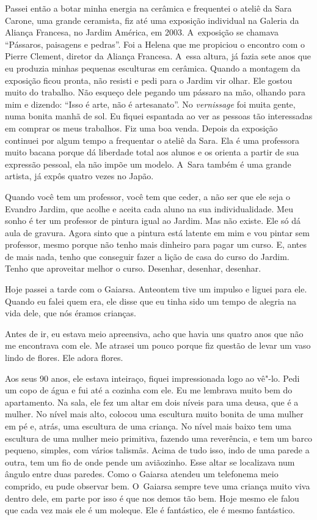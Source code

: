 Passei então a botar minha energia na cerâmica e frequentei o ateliê da
Sara Carone, uma grande ceramista, fiz até uma exposição individual na
Galeria da Aliança Francesa, no Jardim América, em 2003. A~exposição se
chamava ``Pássaros, paisagens e pedras''. Foi a Helena que me propiciou
o encontro com o Pierre Clement, diretor da Aliança Francesa. A~essa
altura, já fazia sete anos que eu produzia minhas pequenas esculturas em
cerâmica. Quando a montagem da exposição ficou pronta, não resisti e
pedi para o Jardim vir olhar. Ele gostou muito do trabalho. Não esqueço
dele pegando um pássaro na mão, olhando para mim e dizendo: ``Isso é
arte, não é artesanato''. No \emph{vernissage} foi muita gente, numa
bonita manhã de sol. Eu fiquei espantada ao ver as pessoas tão
interessadas em comprar os meus trabalhos. Fiz uma boa venda. Depois da
exposição continuei por algum tempo a frequentar o ateliê da Sara. Ela é
uma professora muito bacana porque dá liberdade total aos alunos e os
orienta a partir de sua expressão pessoal, ela não impõe um modelo. A~Sara também é uma grande artista, já expôs quatro vezes no Japão.

Quando você tem um professor, você tem que ceder, a não ser que ele seja
o Evandro Jardim, que acolhe e aceita cada aluno na sua individualidade.
Meu sonho é ter um professor de pintura igual ao Jardim. Mas não existe.
Ele só dá aula de gravura. Agora sinto que a pintura está latente em mim
e vou pintar sem professor, mesmo porque não tenho mais dinheiro para
pagar um curso. E, antes de mais nada, tenho que conseguir fazer a lição
de casa do curso do Jardim. Tenho que aproveitar melhor o curso.
Desenhar, desenhar, desenhar.

Hoje passei a tarde com o Gaiarsa. Anteontem tive um impulso e liguei
para ele. Quando eu falei quem era, ele disse que eu tinha sido um tempo
de alegria na vida dele, que nós éramos crianças.

Antes de ir, eu estava meio apreensiva, acho que havia uns quatro anos
que não me encontrava com ele. Me atrasei um pouco porque fiz questão de
levar um vaso lindo de flores. Ele adora flores.

Aos seus 90 anos, ele estava inteiraço, fiquei impressionada logo ao
vê"-lo. Pedi um copo de água e fui até a cozinha com ele. Eu me lembrava
muito bem do apartamento. Na sala, ele fez um altar em dois níveis para
uma deusa, que é a mulher. No nível mais alto, colocou uma escultura
muito bonita de uma mulher em pé e, atrás, uma escultura de uma criança.
No nível mais baixo tem uma escultura de uma mulher meio primitiva,
fazendo uma reverência, e tem um barco pequeno, simples, com vários
talismãs. Acima de tudo isso, indo de uma parede a outra, tem um fio de
onde pende um aviãozinho. Esse altar se localizava num ângulo entre duas
paredes. Como o Gaiarsa atendeu um telefonema meio comprido, eu pude
observar bem. O~Gaiarsa sempre teve uma criança muito viva dentro dele,
em parte por isso é que nos demos tão bem. Hoje mesmo ele falou que cada vez
mais ele é um moleque. Ele é fantástico, ele é mesmo fantástico.

